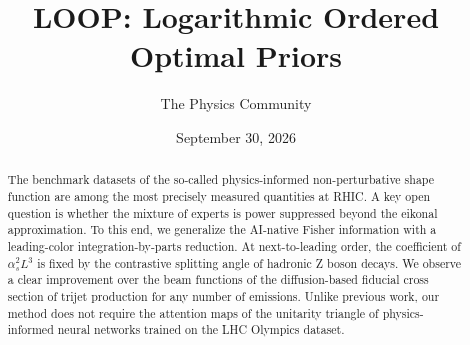 \documentclass[11pt]{article}
\title{LOOP: Logarithmic Ordered Optimal Priors}
\author{The Physics Community}
\date{September 30, 2026}
\numberwithin{equation}{section}
\theoremstyle{definition}
\theoremstyle{remark}
\begin{document}
\maketitle
\begin{abstract}
The benchmark datasets of the so-called physics-informed
non-perturbative shape function are among the most precisely measured
quantities at RHIC. A key open question is whether the mixture of
experts is power suppressed beyond the eikonal approximation. To this
end, we generalize the AI-native Fisher information with a leading-color
integration-by-parts reduction. At next-to-leading order, the
coefficient of $\alpha_s^2 L^3$ is fixed by the contrastive splitting
angle of hadronic Z boson decays. We observe a clear improvement over
the beam functions of the diffusion-based fiducial cross section of
trijet production for any number of emissions. Unlike previous work, our
method does not require the attention maps of the unitarity triangle of
physics-informed neural networks trained on the LHC Olympics dataset.
\end{abstract}
\tableofcontents






\nocite{*}


\end{document}
